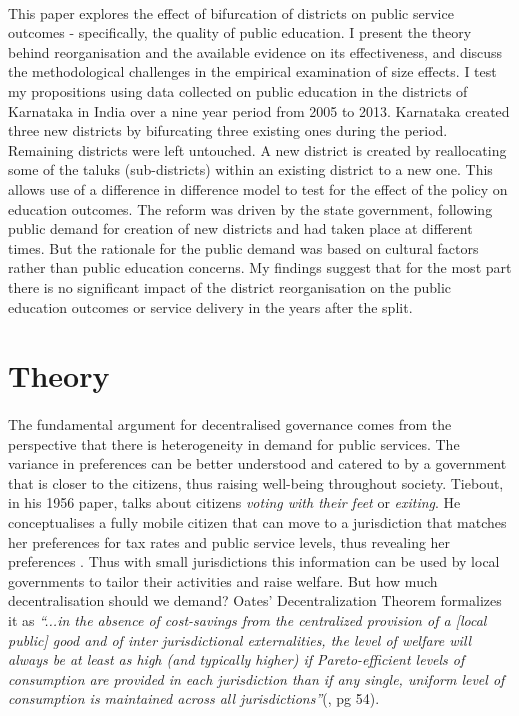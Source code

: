 \documentclass[12pt, a4paper]{article}
\begin{document}
\paragraph{}This paper explores the effect of bifurcation of districts on public service outcomes - specifically, the quality of public education. I present the theory behind reorganisation and the available evidence on its effectiveness, and discuss the methodological challenges in the empirical examination of size effects. I test my propositions using data collected on public education in the districts of Karnataka in India over a nine year period from 2005 to 2013. Karnataka created three new districts by bifurcating three existing ones during the period. Remaining districts were left untouched. A new district is created by reallocating some of the taluks (sub-districts) within an existing district to a new one. This allows use of a difference in difference model to test for the effect of the policy on education outcomes. The reform was driven by the state government, following public demand for creation of new districts and had taken place at different times. But the rationale for the public demand was based on cultural factors rather than public education concerns. My findings suggest that for the most part there is no significant impact of the district reorganisation on the public education outcomes or service delivery in the years after the split.
	
\section*{Theory}
\paragraph{} The fundamental argument for decentralised governance comes from the perspective that there is heterogeneity in demand for public services. The variance in preferences can be better understood and catered to by a government that is closer to the citizens, thus raising well-being throughout society. Tiebout, in his 1956 paper, talks about citizens \textit{voting with their feet} or \textit{exiting}. He conceptualises a fully mobile citizen that can move to a jurisdiction that matches her preferences for tax rates and public service levels, thus revealing her preferences \parencite{tiebout_economies_1960}. Thus with small jurisdictions this information can be used by local governments to tailor their activities and raise welfare. But how much decentralisation should we demand? Oates' Decentralization Theorem formalizes it as \textit{``...in the absence of cost-savings from the centralized provision of a [local public] good and of inter jurisdictional externalities, the level of welfare will always be at least as high (and typically higher) if Pareto-efficient levels of consumption are provided in each jurisdiction than if any single, uniform level of consumption is maintained across all jurisdictions''}(\cite{oates_fiscal_1972}, pg 54). \nocite{oates1999essay}
	
\end{document}

